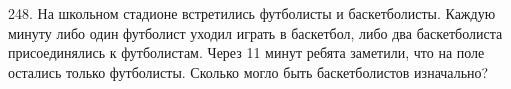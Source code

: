 248. На школьном стадионе встретились футболисты и баскетболисты. Каждую минуту либо один футболист уходил играть в баскетбол, либо два баскетболиста присоединялись к футболистам. Через 11 минут ребята заметили, что на поле остались только футболисты. Сколько могло быть баскетболистов изначально?\\
